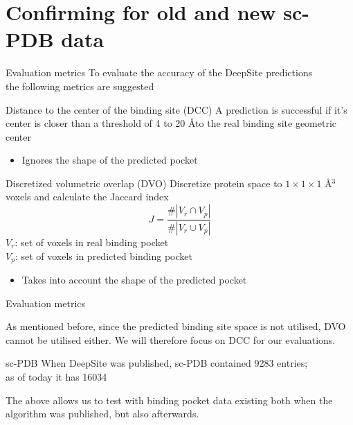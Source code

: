 \documentclass{beamer}
\begin{document}
\section{Confirming for old and new sc-PDB data}

\begin{frame}{Evaluation metrics}
  To evaluate the accuracy of the DeepSite predictions \\
  the following metrics are suggested
  \begin{block}{Distance to the center of the binding site (DCC)}
    A prediction is successful if it's center is closer than a threshold of  4 to 20 \AA\;to the real binding site geometric center
    \begin{itemize}
      \item Ignores the shape of the predicted pocket
    \end{itemize}
  \end{block}
  \begin{block}{Discretized volumetric overlap (DVO)}
    Discretize protein space to $1 \times 1 \times 1$ \AA$^3$ voxels and calculate the Jaccard index
    \[
      J = \frac{\#|V_r \cap V_p|}{\#|V_r \cup V_p|}
    \]
    $V_r$: set of voxels in real binding pocket\\
    $V_p$: set of voxels in predicted binding pocket
    \begin{itemize}
      \item Takes into account the shape of the predicted pocket
    \end{itemize}
  \end{block}
\end{frame}

\begin{frame}{Evaluation metrics}
  \begin{block}{}
    As mentioned before, since the predicted binding site space is not utilised, DVO cannot be utilised either.
  We will therefore focus on DCC for our evaluations.
  \end{block}
  \begin{block}{sc-PDB}
    When DeepSite was published, sc-PDB contained 9283 entries;\\
    as of today it has 16034
  \end{block}
  \begin{block}{}
    The above allows us to test with binding pocket data existing both when the algorithm was published, but also afterwards.
  \end{block}
\end{frame}
\end{document}
